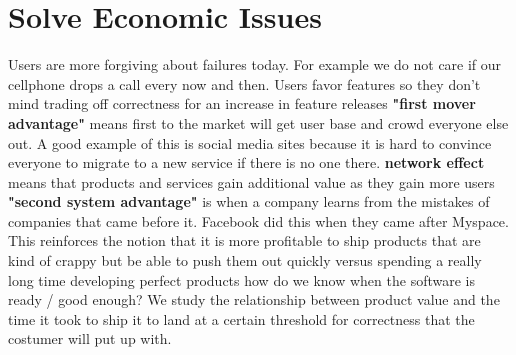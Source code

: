 \documentclass[twoside]{article}
\begin{document}
\section{Solve Economic Issues}
Users are more forgiving about failures today. For example we do not care if our cellphone drops a call every now and then. 
\newline
Users favor features so they don't mind trading off correctness for an increase in feature releases
\newline
\textbf{"first mover advantage"} means first to the market will get user base and crowd everyone else out. A good example of this is social media sites because it is hard to convince everyone to migrate to a new service if there is no one there.
\newline
\textbf{network effect} means that products and services gain additional value as they gain more users
\newline
\textbf{"second system advantage"} is when a company learns from the mistakes of companies that came before it. Facebook did this when they came after Myspace.
\newline
This reinforces the notion that it is more profitable to ship products that are kind of crappy but be able to push them out quickly versus spending a really long time developing perfect products
\newline
how do we know when the software is ready / good enough?
\newline
We study the relationship between product value and the time it took to ship it to land at a certain threshold for correctness that the costumer will put up with. 
\end{document}
